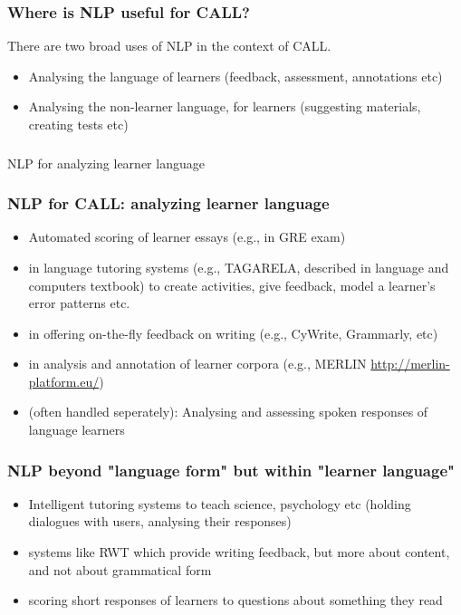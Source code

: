 \documentclass{beamer}
\begin{document}
\begin{frame}
\frametitle{Where is NLP useful for CALL?}
There are two broad uses of NLP in the context of CALL.
\begin{itemize}
\item Analysing the language of learners (feedback, assessment, annotations etc)
\item Analysing the non-learner language, for learners (suggesting materials, creating tests etc) 
\end{itemize}
\end{frame}

\begin{frame}
\frametitle{}
\Large NLP for analyzing learner language
\end{frame}

\begin{frame}
\frametitle{NLP for CALL: analyzing learner language}
\begin{itemize}
\item Automated scoring of learner essays (e.g., in GRE exam)
\item in language tutoring systems (e.g., TAGARELA, described in language and computers textbook) to create activities, give feedback, model a learner's error patterns etc.
\item in offering on-the-fly feedback on writing (e.g., CyWrite, Grammarly, etc)
\item in analysis and annotation of learner corpora (e.g., MERLIN \url{http://merlin-platform.eu/})
\item (often handled seperately): Analysing and assessing spoken responses of language learners
\end{itemize}
\end{frame}

\begin{frame}
\frametitle{NLP beyond "language form" but within "learner language"}
\begin{itemize}
\item Intelligent tutoring systems to teach science, psychology etc (holding dialogues with users, analysing their responses)
\item systems like RWT which provide writing feedback, but more about content, and not about grammatical form
\item scoring short responses of learners to questions about something they read
\end{itemize}
\end{frame}
\end{document}
